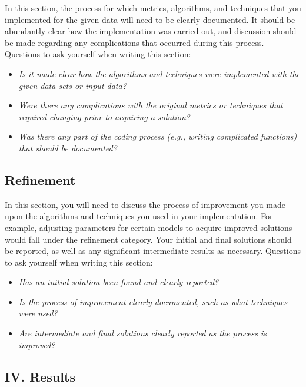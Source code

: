\documentclass{article}
\begin{document}
In this section, the process for which metrics, algorithms, and
techniques that you implemented for the given data will need to be
clearly documented. It should be abundantly clear how the implementation
was carried out, and discussion should be made regarding any
complications that occurred during this process. Questions to ask
yourself when writing this section:

\begin{itemize}
\item
  \emph{Is it made clear how the algorithms and techniques were
  implemented with the given data sets or input data?}
\item
  \emph{Were there any complications with the original metrics or
  techniques that required changing prior to acquiring a solution?}
\item
  \emph{Was there any part of the coding process (e.g., writing
  complicated functions) that should be documented?}
\end{itemize}

\subsection{Refinement}\label{refinement}

In this section, you will need to discuss the process of improvement you
made upon the algorithms and techniques you used in your implementation.
For example, adjusting parameters for certain models to acquire improved
solutions would fall under the refinement category. Your initial and
final solutions should be reported, as well as any significant
intermediate results as necessary. Questions to ask yourself when
writing this section:

\begin{itemize}
\item
  \emph{Has an initial solution been found and clearly reported?}
\item
  \emph{Is the process of improvement clearly documented, such as what
  techniques were used?}
\item
  \emph{Are intermediate and final solutions clearly reported as the
  process is improved?}
\end{itemize}

\hypertarget{iv.-results}{%
\subsection{IV. Results}\label{iv.-results}}
\end{document}
